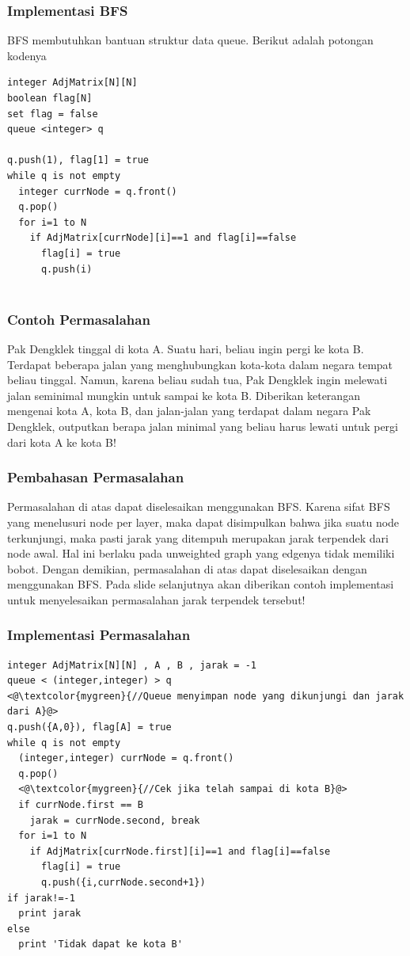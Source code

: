 \begin{frame}[fragile]
\frametitle{Implementasi BFS}
BFS membutuhkan bantuan struktur data queue. Berikut adalah potongan kodenya\newline
\begin{lstlisting}
integer AdjMatrix[N][N]
boolean flag[N]
set flag = false
queue <integer> q

q.push(1), flag[1] = true
while q is not empty
  integer currNode = q.front()
  q.pop()
  for i=1 to N
    if AdjMatrix[currNode][i]==1 and flag[i]==false
      flag[i] = true
      q.push(i)
        
\end{lstlisting}
\end{frame}

\begin{frame}
\frametitle{Contoh Permasalahan}
Pak Dengklek tinggal di kota A. Suatu hari, beliau ingin pergi ke kota B. Terdapat beberapa jalan yang menghubungkan kota-kota dalam negara tempat beliau tinggal. Namun, karena beliau sudah tua, Pak Dengklek ingin melewati jalan seminimal mungkin untuk sampai ke kota B.
\newline\newline
Diberikan keterangan mengenai kota A, kota B, dan jalan-jalan yang terdapat dalam negara Pak Dengklek, outputkan berapa jalan minimal yang beliau harus lewati untuk pergi dari kota A ke kota B!
\end{frame}

\begin{frame}
\frametitle{Pembahasan Permasalahan}
Permasalahan di atas dapat diselesaikan menggunakan BFS. Karena sifat BFS yang menelusuri node per layer, maka dapat disimpulkan bahwa jika suatu node terkunjungi, maka pasti jarak yang ditempuh merupakan jarak terpendek dari node awal. Hal ini berlaku pada unweighted graph yang edgenya tidak memiliki bobot.
\newline\newline
Dengan demikian, permasalahan di atas dapat diselesaikan dengan menggunakan BFS. Pada slide selanjutnya akan diberikan contoh implementasi untuk menyelesaikan permasalahan jarak terpendek tersebut!
\end{frame}

\begin{frame}[fragile]
\frametitle{Implementasi Permasalahan}

\begin{lstlisting}
integer AdjMatrix[N][N] , A , B , jarak = -1
queue < (integer,integer) > q
<@\textcolor{mygreen}{//Queue menyimpan node yang dikunjungi dan jarak dari A}@>
q.push({A,0}), flag[A] = true
while q is not empty
  (integer,integer) currNode = q.front()
  q.pop()
  <@\textcolor{mygreen}{//Cek jika telah sampai di kota B}@>
  if currNode.first == B
    jarak = currNode.second, break
  for i=1 to N
    if AdjMatrix[currNode.first][i]==1 and flag[i]==false
      flag[i] = true
      q.push({i,currNode.second+1})
if jarak!=-1
  print jarak
else
  print 'Tidak dapat ke kota B'    
\end{lstlisting}
\end{frame}

